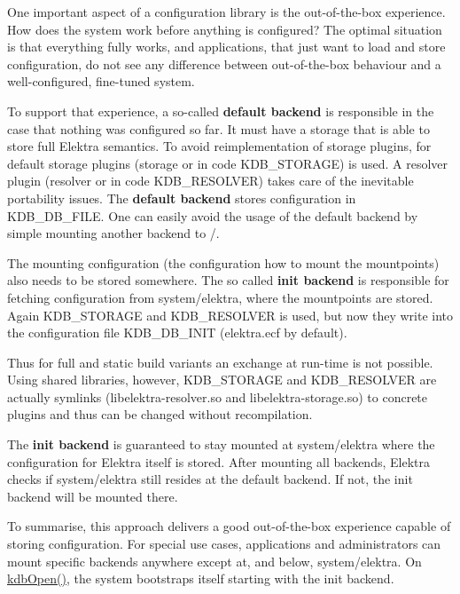 One important aspect of a configuration library is the out-\/of-\/the-\/box experience. How does the system work before anything is configured? The optimal situation is that everything fully works, and applications, that just want to load and store configuration, do not see any difference between out-\/of-\/the-\/box behaviour and a well-\/configured, fine-\/tuned system.

To support that experience, a so-\/called {\bfseries default backend} is responsible in the case that nothing was configured so far. It must have a storage that is able to store full Elektra semantics. To avoid reimplementation of storage plugins, for default storage plugins ({\ttfamily storage} or in code {\ttfamily K\+D\+B\+\_\+\+S\+T\+O\+R\+A\+G\+E}) is used. A resolver plugin ({\ttfamily resolver} or in code {\ttfamily K\+D\+B\+\_\+\+R\+E\+S\+O\+L\+V\+E\+R}) takes care of the inevitable portability issues. The {\bfseries default backend} stores configuration in {\ttfamily K\+D\+B\+\_\+\+D\+B\+\_\+\+F\+I\+L\+E}. One can easily avoid the usage of the default backend by simple mounting another backend to {\ttfamily /}.

The mounting configuration (the configuration how to mount the mountpoints) also needs to be stored somewhere. The so called {\bfseries init backend} is responsible for fetching configuration from {\ttfamily system/elektra}, where the mountpoints are stored. Again {\ttfamily K\+D\+B\+\_\+\+S\+T\+O\+R\+A\+G\+E} and {\ttfamily K\+D\+B\+\_\+\+R\+E\+S\+O\+L\+V\+E\+R} is used, but now they write into the configuration file {\ttfamily K\+D\+B\+\_\+\+D\+B\+\_\+\+I\+N\+I\+T} (elektra.\+ecf by default).

Thus for full and static build variants an exchange at run-\/time is not possible. Using shared libraries, however, {\ttfamily K\+D\+B\+\_\+\+S\+T\+O\+R\+A\+G\+E} and {\ttfamily K\+D\+B\+\_\+\+R\+E\+S\+O\+L\+V\+E\+R} are actually symlinks ({\ttfamily libelektra-\/resolver.\+so} and {\ttfamily libelektra-\/storage.\+so}) to concrete plugins and thus can be changed without recompilation.

The {\bfseries init backend} is guaranteed to stay mounted at {\ttfamily system/elektra} where the configuration for Elektra itself is stored. After mounting all backends, Elektra checks if {\ttfamily system/elektra} still resides at the default backend. If not, the init backend will be mounted there.

To summarise, this approach delivers a good out-\/of-\/the-\/box experience capable of storing configuration. For special use cases, applications and administrators can mount specific backends anywhere except at, and below, {\ttfamily system/elektra}. On {\ttfamily \hyperlink{group__kdb_ga6808defe5870f328dd17910aacbdc6ca}{kdb\+Open()}}, the system bootstraps itself starting with the init backend.


